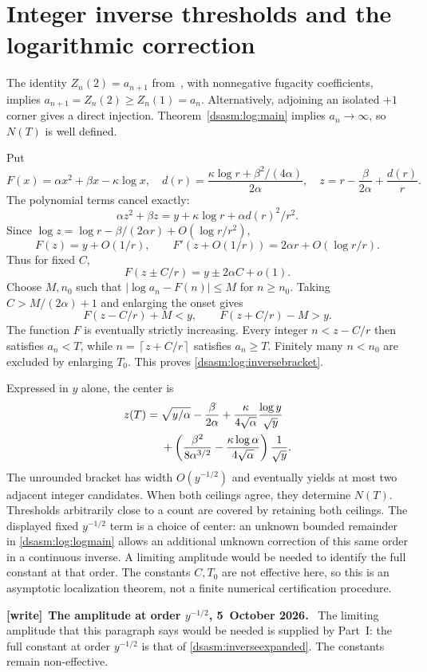\documentclass[11pt,letterpaper]{article}
\theoremstyle{remark}\newtheorem{remark}[theorem]{Remark}
\newcommand{\ceil}[1]{\left\lceil#1\right\rceil}
\newenvironment{writenote}[1][]{\par\smallskip\begingroup\small
 \noindent\textbf{[write]}\if\relax\detokenize{#1}\relax\else~\textbf{#1.}\fi\ }%
 {\par\endgroup\smallskip}
\begin{document}
\section{Integer inverse thresholds and the logarithmic correction}
\label{dsasm:log:sec:inverse}
The identity $Z_n(2)=a_{n+1}$ from~\cite[Proposition 5.1]{bfk},
with nonnegative fugacity coefficients, implies
$a_{n+1}=Z_n(2)\ge Z_n(1)=a_n$. Alternatively, adjoining an isolated
$+1$ corner gives a direct injection. Theorem~\ref{dsasm:log:main} implies
$a_n\to\infty$, so $N(T)$ is well defined.

Put
\[
 F(x)=\alpha x^2+\beta x-\kappa\log x,\quad
 d(r)=\frac{\kappa\log r+\beta^2/(4\alpha)}{2\alpha},\quad
 z=r-\frac{\beta}{2\alpha}+\frac{d(r)}r.
\]
The polynomial terms cancel exactly:
\[
 \alpha z^2+\beta z
 =y+\kappa\log r+\alpha d(r)^2/r^2.
\]
Since $\log z=\log r-\beta/(2\alpha r)+O(\log r/r^2)$,
\begin{equation}\label{dsasm:log:inverseF}
 F(z)=y+O(1/r),\qquad
 F'(z+O(1/r))=2\alpha r+O(\log r/r).
\end{equation}
Thus for fixed $C$,
\[
 F(z\pm C/r)=y\pm2\alpha C+o(1).
\]
Choose $M,n_0$ such that $|\log a_n-F(n)|\le M$ for $n\ge n_0$.
Taking $C>M/(2\alpha)+1$ and enlarging the onset gives
\[
 F(z-C/r)+M<y,\qquad F(z+C/r)-M>y.
\]
The function $F$ is eventually strictly increasing. Every integer
$n<z-C/r$ then satisfies $a_n<T$, while $n=\ceil{z+C/r}$ satisfies
$a_n\ge T$. Finitely many $n<n_0$ are excluded by enlarging $T_0$.
This proves \eqref{dsasm:log:inversebracket}.

Expressed in $y$ alone, the center is
\begin{align}\label{dsasm:log:inverseexpanded}
 z(T)={}&\sqrt{y/\alpha}-\frac{\beta}{2\alpha}
       +\frac{\kappa}{4\sqrt\alpha}\frac{\log y}{\sqrt y}\notag\\
 &+\left(\frac{\beta^2}{8\alpha^{3/2}}
          -\frac{\kappa\log\alpha}{4\sqrt\alpha}\right)\frac1{\sqrt y}.
\end{align}
The unrounded bracket has width $O(y^{-1/2})$ and eventually yields
at most two adjacent integer candidates. When both ceilings agree,
they determine $N(T)$. Thresholds arbitrarily close to a count are
covered by retaining both ceilings. The displayed fixed $y^{-1/2}$
term is a choice of center: an unknown bounded remainder in
\eqref{dsasm:log:logmain} allows an additional unknown correction of this same
order in a continuous inverse. A limiting amplitude would be needed
to identify the full constant at that order. The constants $C,T_0$
are not effective here, so this is an asymptotic localization theorem,
not a finite numerical certification procedure.
\begin{writenote}[The amplitude at order $y^{-1/2}$, 5~October 2026]
The limiting amplitude that this paragraph says would be needed is supplied by Part~I: the full constant at order $y^{-1/2}$ is that of \eqref{dsasm:inverseexpanded}. The constants remain non-effective.
\end{writenote}
\end{document}
